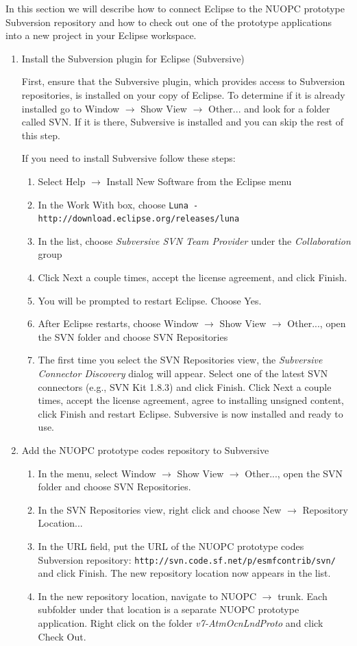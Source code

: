 \documentclass[oneside,11pt]{memoir}
\begin{document}
In this section we will describe how to connect Eclipse to the NUOPC prototype Subversion repository and how to check out one of the prototype applications into a new project in your Eclipse workspace.

\begin{enumerate}

\item Install the Subversion plugin for Eclipse (Subversive)

First, ensure that the Subversive plugin, which provides access to Subversion repositories, is installed on your copy of Eclipse.  To determine if it is already installed go to Window $\rightarrow$ Show View $\rightarrow$ Other... and look for a folder called SVN. If it is there, Subversive is installed and you can skip the rest of this step.

If you need to install Subversive follow these steps:
\begin{enumerate}
\item Select Help $\rightarrow$ Install New Software from the Eclipse menu
\item In the Work With box, choose \texttt{Luna - http://download.eclipse.org/releases/luna}
\item In the list, choose \emph{Subversive SVN Team Provider} under the \emph{Collaboration} group
\item Click Next a couple times, accept the license agreement, and click Finish.
\item You will be prompted to restart Eclipse.  Choose Yes.
\item After Eclipse restarts, choose Window $\rightarrow$ Show View $\rightarrow$ Other..., open the SVN folder and choose SVN Repositories
\item The first time you select the SVN Repositories view, the \emph{Subversive Connector Discovery} dialog will appear.  Select one of the latest SVN connectors (e.g., SVN Kit 1.8.3) and click Finish.  Click Next a couple times, accept the license agreement, agree to installing unsigned content, click Finish and restart Eclipse.  Subversive is now installed and ready to use.
\end{enumerate}

\item Add the NUOPC prototype codes repository to Subversive
\begin{enumerate}
\item In the menu, select Window $\rightarrow$ Show View $\rightarrow$ Other..., open the SVN folder and choose SVN Repositories.
\item In the SVN Repositories view, right click and choose New $\rightarrow$ Repository Location...
\item In the URL field, put the URL of the NUOPC prototype codes Subversion repository: \texttt{http://svn.code.sf.net/p/esmfcontrib/svn/} and click Finish.  The new repository location now appears in the list.
\item In the new repository location, navigate to NUOPC $\rightarrow$ trunk.  Each subfolder under that location is a separate NUOPC prototype application. Right click on the folder \emph{v7-AtmOcnLndProto} and click Check Out.


\end{enumerate}
\end{enumerate}
\end{document}
